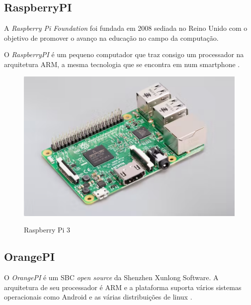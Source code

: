 \subsection{RaspberryPI}

A \textit{Raspberry Pi Foundation} foi fundada em 2008 sediada no Reino Unido com o objetivo de promover o avanço na educação no campo da computação. \cite{rasp}

O \textit{RaspberryPI} é um pequeno computador que traz consigo um processador na arquitetura ARM, a mesma tecnologia que se encontra em num smartphone \cite{rasp}.\newline

\begin{figure}[!htbp]
  \caption{Raspberry Pi 3}
  \includegraphics[scale=0.4]{images/rasp.png}
  \label{figura:rasp}
\end{figure}

\subsection{OrangePI}

O \textit{OrangePI} é um SBC \textit{open source} da Shenzhen Xunlong Software. A arquitetura de seu processador é ARM e a plataforma suporta vários sistemas operacionais como Android e as várias distribuições de linux \cite{orangepi}.\newline

